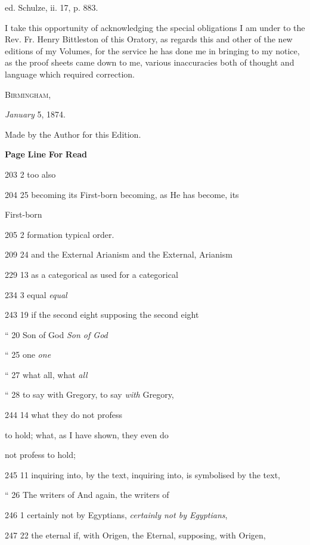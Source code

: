 ed. Schulze, ii. 17, p. 883.






I take this opportunity of acknowledging the special obligations I
am under to the Rev. Fr. Henry Bittleston of this Oratory, as regards
this and other of the new editions of my Volumes, for the service he
has done me in bringing to my notice, as the proof sheets came down to
me, various inaccuracies both of thought and language which required
correction.


B\textsc{irmingham},

\emph{January} 5, 1874.








Made by the Author for this Edition.



\textbf{Page}
\textbf{Line}
\textbf{For}
\textbf{Read}


203
2
too
also


204
25
becoming its First-born
becoming, as He has become, its

First-born


205
2
formation
typical order.


209
24
and the External Arianism
and the External, Arianism


229
13
as a categorical
as used for a categorical


234
3
equal
\emph{equal}


243
19
if the second eight
supposing the second eight


``
20
Son of God
\emph{Son of God}


``
25
one
\emph{one}


``
27
what all,
what \emph{all}


``
28
to say with Gregory,
to say \emph{with} Gregory,


244
14
what they do not profess

to hold;
what, as I have shown, they even do

not profess to hold;


245
11
inquiring into, by the text,
inquiring into, is symbolised by the text,


``
26
The writers of
And again, the writers of


246
1
certainly not by Egyptians,
\emph{certainly not by Egyptians},


247
22
the eternal if, with Origen,
the Eternal, supposing, with Origen,


